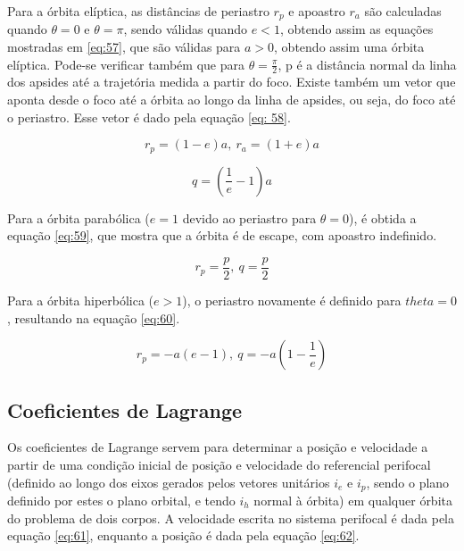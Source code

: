 Para a órbita elíptica, as distâncias de periastro $r_{p}$ e apoastro $r_{a}$ são calculadas quando $\theta = 0$ e $\theta = \pi$, sendo válidas quando $e<1$, obtendo assim as equações mostradas em \ref{eq:57}, que são válidas para $a>0$, obtendo assim uma órbita elíptica. Pode-se verificar também que para $\theta = \frac{\pi}{2}$, p é a distância normal da linha dos apsides até a trajetória medida a partir do foco. Existe também um vetor que aponta desde o foco até a órbita ao longo da linha de apsides, ou seja, do foco até o periastro. Esse vetor é dado pela equação \ref{eq: 58}.

\begin{equation}
    r_{p} = (1-e)a, \ r_{a} = (1+e)a
    \label{eq:57}
\end{equation}

\begin{equation}
    q = \left(  \frac{1}{e} - 1\right)a
    \label{eq: 58}
\end{equation}

Para a órbita parabólica ($e = 1$ devido ao periastro para $\theta = 0$), é obtida a equação \ref{eq:59}, que mostra que a órbita é de escape, com apoastro indefinido.

\begin{equation}
    r_{p} = \frac{p}{2}, \ q = \frac{p}{2}
    \label{eq:59}
\end{equation}

Para a órbita hiperbólica ($e >1$), o periastro novamente é definido para $theta = 0$, resultando na equação \ref{eq:60}.

\begin{equation}
    r_{p} = -a(e-1), \ q = -a \left( 1-\frac{1}{e}\right)
    \label{eq:60}
\end{equation}

\subsection{Coeficientes de Lagrange}

Os coeficientes de Lagrange servem para determinar a posição e velocidade a partir de uma condição inicial de posição e velocidade do referencial perifocal (definido ao longo dos eixos gerados pelos vetores unitários $i_e$ e $i_{p}$, sendo o plano definido por estes o plano orbital, e tendo $i_{h}$ normal à órbita) em qualquer órbita do problema de dois corpos. A velocidade escrita no sistema perifocal é dada pela equação \ref{eq:61}, enquanto a posição é dada pela equação \ref{eq:62}.


